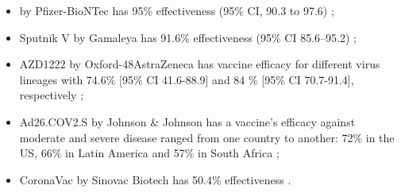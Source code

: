 %
    \begin{itemize}
        \item
            by Pfizer-BioNTec has
            95\% effectiveness (95\% CI, 90.3 to 97.6) \cite{Polack2020};
        \item
            Sputnik V by Gamaleya has
            91.6\% effectiveness (95\% CI 85.6–95.2) \cite{Logunov2021};
        \item
            AZD1222 by Oxford-48AstraZeneca has vaccine efficacy for
            different virus lineages with 74.6\% [95\% CI 41.6-88.9] and
            84 \% [95\% CI 70.7-91.4], respectively \cite{Emary2021};
        \item
            Ad26.COV2.S by Johnson \& Johnson has a vaccine's efficacy against
            moderate and severe disease ranged from one country to another:
            72\% in the US, 66\% in Latin America and 57\% in South Africa
            \cite{johnsonandjohnson};
        \item CoronaVac by Sinovac Biotech has 50.4\% effectiveness
            \cite{vaccine_tracker2020}.
    \end{itemize}

